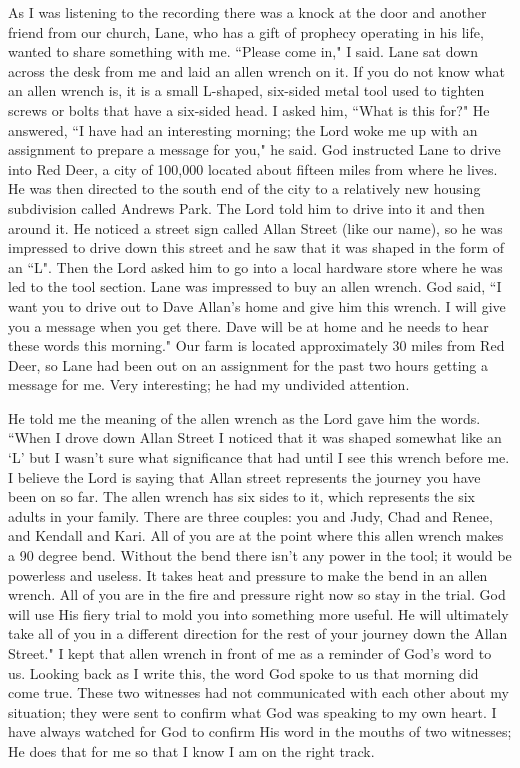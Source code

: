 \documentclass[oneside]{book}
\begin{document}
As I was listening to the recording there was a knock at the door and another friend from our church, Lane, who has a gift of prophecy operating in his life, wanted to share something with me. ``Please come in," I said. Lane sat down across the desk from me and laid an allen wrench on it. If you do not know what an allen wrench is, it is a small L-shaped, six-sided metal tool used to tighten screws or bolts that have a six-sided head. I asked him, ``What is this for?" He answered, ``I have had an interesting morning; the Lord woke me up with an assignment to prepare a message for you," he said. God instructed Lane to drive into Red Deer, a city of 100,000 located about fifteen miles from where he lives. He was then directed to the south end of the city to a relatively new housing subdivision called Andrews Park. The Lord told him to drive into it and then around it. He noticed a street sign called Allan Street (like our name), so he was impressed to drive down this street and he saw that it was shaped in the form of an ``L". Then the Lord asked him to go into a local hardware store where he was led to the tool section. Lane was impressed to buy an allen wrench. God said, ``I want you to drive out to Dave Allan's home and give him this wrench. I will give you a message when you get there. Dave will be at home and he needs to hear these words this morning." Our farm is located approximately 30 miles from Red Deer, so Lane had been out on an assignment for the past two hours getting a message for me. Very interesting; he had my undivided attention. 


He told me the meaning of the allen wrench as the Lord gave him the words. ``When I drove down Allan Street I noticed that it was shaped somewhat like an `L' but I wasn't sure what significance that had until I see this wrench before me. I believe the Lord is saying that Allan street represents the journey you have been on so far. The allen wrench has six sides to it, which represents the six adults in your family. There are three couples: you and Judy, Chad and Renee, and Kendall and Kari. All of you are at the point where this allen wrench makes a 90 degree bend. Without the bend there isn't any power in the tool; it would be powerless and useless. It takes heat and pressure to make the bend in an allen wrench. All of you are in the fire and pressure right now so stay in the trial. God will use His fiery trial to mold you into something more useful. He will ultimately take all of you in a different direction for the rest of your journey down the Allan Street." I kept that allen wrench in front of me as a reminder of God's word to us. Looking back as I write this, the word God spoke to us that morning did come true. These two witnesses had not communicated with each other about my situation; they were sent to confirm what God was speaking to my own heart. I have always watched for God to confirm His word in the mouths of two witnesses; He does that for me so that I know I am on the right track.
\end{document}

